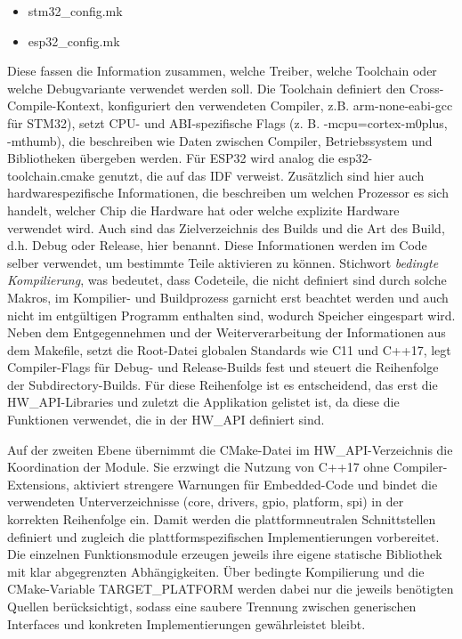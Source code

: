\begin{itemize}
	\item stm32\_config.mk
	\item esp32\_config.mk
\end{itemize}

Diese fassen die Information zusammen, welche Treiber, welche Toolchain oder welche Debugvariante verwendet werden soll.
Die Toolchain definiert den Cross-Compile-Kontext, konfiguriert den verwendeten Compiler, z.B. arm-none-eabi-gcc für STM32), setzt CPU- und ABI-spezifische Flags (z. B. -mcpu=cortex-m0plus, -mthumb), die beschreiben wie Daten zwischen Compiler, Betriebssystem und Bibliotheken übergeben werden.
Für ESP32 wird analog die esp32-toolchain.cmake genutzt, die auf das IDF verweist.
Zusätzlich sind hier auch hardwarespezifische Informationen, die beschreiben um welchen Prozessor es sich handelt, welcher Chip die Hardware hat oder welche explizite Hardware verwendet wird.
Auch sind das Zielverzeichnis des Builds und die Art des Build, d.h. Debug oder Release, hier benannt.
Diese Informationen werden im Code selber verwendet, um bestimmte Teile aktivieren zu können.
Stichwort \textit{bedingte Kompilierung}, was bedeutet, dass Codeteile, die nicht definiert sind durch solche Makros, im Kompilier- und Buildprozess garnicht erst beachtet werden und auch nicht im entgültigen Programm enthalten sind, wodurch Speicher eingespart wird.
Neben dem Entgegennehmen und der Weiterverarbeitung der Informationen aus dem Makefile, setzt die Root-Datei globalen Standards wie C11 und C++17, legt Compiler-Flags für Debug- und Release-Builds fest und steuert die Reihenfolge der Subdirectory-Builds.
Für diese Reihenfolge ist es entscheidend, das erst die HW\_API-Libraries und zuletzt die Applikation gelistet ist, da diese die Funktionen verwendet, die in der HW\_API definiert sind.

Auf der zweiten Ebene übernimmt die CMake-Datei im HW\_API-Verzeichnis die Koordination der Module. 
Sie erzwingt die Nutzung von C++17 ohne Compiler-Extensions, aktiviert strengere Warnungen für Embedded-Code und bindet die verwendeten Unterverzeichnisse (core, drivers, gpio, platform, spi) in der korrekten Reihenfolge ein.
Damit werden die plattformneutralen Schnittstellen definiert und zugleich die plattformspezifischen Implementierungen vorbereitet. 
Die einzelnen Funktionsmodule erzeugen jeweils ihre eigene statische Bibliothek mit klar abgegrenzten Abhängigkeiten. 
Über bedingte Kompilierung und die CMake-Variable TARGET\_PLATFORM werden dabei nur die jeweils benötigten Quellen berücksichtigt, sodass eine saubere Trennung zwischen generischen Interfaces und konkreten Implementierungen gewährleistet bleibt.

